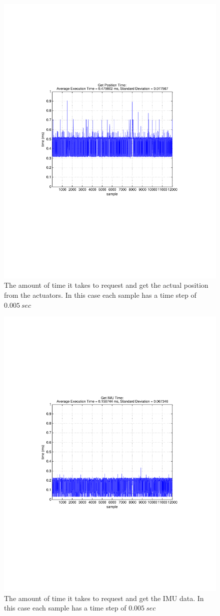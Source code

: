 \begin{figure}[thpb]
  \centering
\includegraphics[width=0.6\columnwidth]{./timingData/getPos.pdf}
  \caption{The amount of time it takes to request and get the actual position from the actuators.  In this case each sample has a time step of $0.005~sec$}
  \label{fig:timing-getPos}
\end{figure}

\begin{figure}[thpb]
  \centering
\includegraphics[width=0.6\columnwidth]{./timingData/getImu.pdf}
  \caption{The amount of time it takes to request and get the IMU data.  In this case each sample has a time step of $0.005~sec$}
  \label{fig:timing-imu}
\end{figure}


